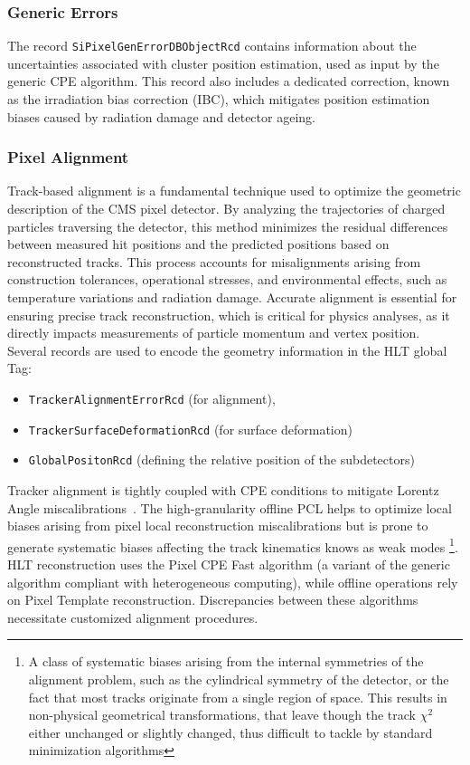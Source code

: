 \subsubsection{Generic Errors}
The record \texttt{SiPixelGenErrorDBObjectRcd} contains information about the uncertainties associated with cluster position estimation, used as input by the generic CPE algorithm. This record also includes a dedicated correction, known as the irradiation bias correction (IBC), which mitigates position estimation biases caused by radiation damage and detector ageing.

\subsubsection{Pixel Alignment}
Track-based alignment is a fundamental technique used to optimize the geometric description of the CMS pixel detector. By analyzing the trajectories of charged particles traversing the detector, this method minimizes the residual differences between measured hit positions and the predicted positions based on reconstructed tracks. This process accounts for misalignments arising from construction tolerances, operational stresses, and environmental effects, such as temperature variations and radiation damage. Accurate alignment is essential for ensuring precise track reconstruction, which is critical for physics analyses, as it directly impacts measurements of particle momentum and vertex position.
Several records are used to encode the geometry information in the HLT global Tag: 
\begin{itemize}
\item \texttt{TrackerAlignmentErrorRcd} (for alignment), 
\item \texttt{TrackerSurfaceDeformationRcd} (for surface deformation)  \item \texttt{GlobalPositonRcd} (defining the relative position of the subdetectors) 
\end{itemize}

Tracker alignment is tightly coupled with CPE conditions to mitigate Lorentz Angle miscalibrations~\cite{CMS:2021ime}. The high-granularity offline PCL helps to optimize local biases arising from pixel local reconstruction miscalibrations but is prone to generate systematic biases affecting the track kinematics knows as weak modes \footnote{A class of systematic biases arising from the internal symmetries of the alignment problem, such as the cylindrical symmetry of the detector, or the fact that most tracks originate from a single region of space. This results in non-physical geometrical transformations, that leave though the track $\chi^{2}$ either unchanged or slightly changed, thus difficult to tackle by standard minimization algorithms}.
HLT reconstruction uses the Pixel CPE Fast algorithm (a variant of the generic algorithm compliant with heterogeneous computing), while offline operations rely on Pixel Template reconstruction. Discrepancies between these algorithms necessitate customized alignment procedures.

